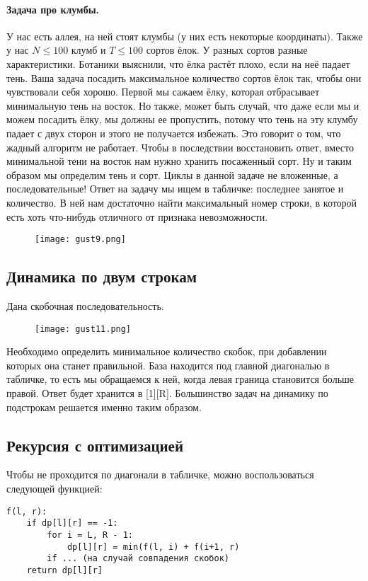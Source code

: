 \documentclass[a4paper,12pt]{article}
\begin{document}
\paragraph{Задача про клумбы.}
У нас есть аллея, на ней стоят клумбы (у них есть некоторые координаты). Также у нас $N \leq 100$ клумб и $T \leq 100$ сортов ёлок. У разных сортов разные характеристики. Ботаники выяснили, что ёлка растёт плохо, если на неё падает тень. Ваша задача посадить максимальное количество сортов ёлок так, чтобы они чувствовали себя хорошо. Первой мы сажаем ёлку, которая отбрасывает минимальную тень на восток. Но также, может быть случай, что даже если мы и можем посадить ёлку, мы должны ее пропустить, потому что тень на эту клумбу падает с двух сторон и этого не получается избежать. Это говорит о том, что жадный алгоритм не работает. Чтобы в последствии восстановить ответ, вместо минимальной тени на восток нам нужно хранить посаженный сорт. Ну и таким образом мы определим тень и сорт. Циклы в данной задаче не вложенные, а последовательные! Ответ на задачу мы ищем в табличке: последнее занятое и количество. В ней нам достаточно найти максимальный номер строки, в которой есть хоть что-нибудь отличного от признака невозможности.
\begin{figure}[h]
\centering
\texttt{[image: gust9.png]}
\end{figure}
\subsection{Динамика по двум строкам}
Дана скобочная последовательность.
\begin{figure}[h]
\centering
\texttt{[image: gust11.png]}
\end{figure}
Необходимо определить минимальное количество скобок, при добавлении которых она станет правильной. База находится под главной диагональю в табличке, то есть мы обращаемся к ней, когда левая граница становится больше правой. Ответ будет хранится в [1][R]. Большинство задач на динамику по подстрокам решается именно таким образом. 
\subsection{Рекурсия с оптимизацией}
Чтобы не проходится по диагонали в табличке, можно воспользоваться следующей функцией:
\begin{verbatim}
f(l, r):
    if dp[l][r] == -1:
        for i = L, R - 1:
            dp[l][r] = min(f(l, i) + f(i+1, r)
        if ... (на случай совпадения скобок)
    return dp[l][r]
\end{verbatim}
\newpage
\end{document}
